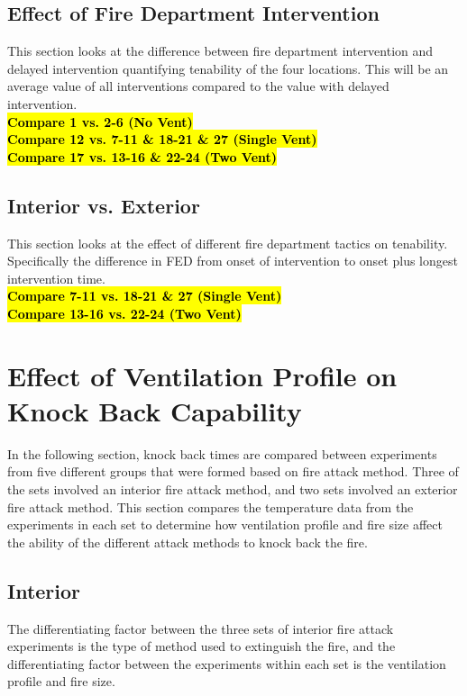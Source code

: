 \documentclass[12pt,oneside]{book}
\begin{document}
\clearpage

\subsection{Effect of Fire Department Intervention}
This section looks at the difference between fire department intervention and delayed intervention quantifying tenability of the four locations. This will be an average value of all interventions compared to the value with delayed intervention. \\
\textbf{\hl{Compare 1 vs. 2-6 (No Vent)}} \\
\textbf{\hl{Compare 12 vs. 7-11 \& 18-21 \& 27 (Single Vent)}} \\
\textbf{\hl{Compare 17 vs. 13-16 \& 22-24 (Two Vent)}} \\

\subsection{Interior vs. Exterior}
This section looks at the effect of different fire department tactics on tenability. Specifically the difference in FED from onset of intervention to onset plus longest intervention time. \\
\textbf{\hl{Compare 7-11 vs. 18-21 \& 27 (Single Vent)}} \\
\textbf{\hl{Compare 13-16 vs. 22-24 (Two Vent)}} \\

\section{Effect of Ventilation Profile on Knock Back Capability}
In the following section, knock back times are compared between experiments from five different groups that were formed based on fire attack method. Three of the sets involved an interior fire attack method, and two sets involved an exterior fire attack method. This section compares the temperature data from the experiments in each set to determine how ventilation profile and fire size affect the ability of the different attack methods to knock back the fire. 

\subsection{Interior}
The differentiating factor between the three sets of interior fire attack experiments is the type of method used to extinguish the fire, and the differentiating factor between the experiments within each set is the ventilation profile and fire size. 
\end{document}
